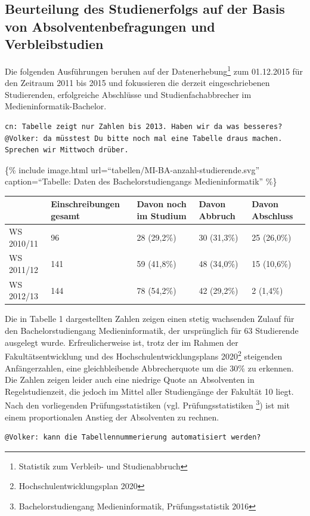 \subsection{Beurteilung des Studienerfolgs auf der Basis von
Absolventenbefragungen und
Verbleibstudien}\label{beurteilung-des-studienerfolgs-auf-der-basis-von-absolventenbefragungen-und-verbleibstudien}

Die folgenden Ausführungen beruhen auf der Datenerhebung\footnote{Statistik
  zum Verbleib- und Studienabbruch} zum 01.12.2015 für den Zeitraum 2011
bis 2015 und fokussieren die derzeit eingeschriebenen Studierenden,
erfolgreiche Abschlüsse und Studienfachabbrecher im
Medieninformatik-Bachelor.

\begin{verbatim}
cn: Tabelle zeigt nur Zahlen bis 2013. Haben wir da was besseres?
@Volker: da müsstest Du bitte noch mal eine Tabelle draus machen. Sprechen wir Mittwoch drüber.
\end{verbatim}

\{\% include image.html url=``tabellen/MI-BA-anzahl-studierende.svg''
caption=``Tabelle: Daten des Bachelorstudiengangs Medieninformatik''
\%\}

\begin{longtable}[]{@{}lllll@{}}
\toprule
~ & Einschreibungen gesamt & Davon noch im Studium & Davon Abbruch &
Davon Abschluss\tabularnewline
\midrule
\endhead
WS 2010/11 & 96 & 28 (29,2\%) & 30 (31,3\%) & 25 (26,0\%)\tabularnewline
WS 2011/12 & 141 & 59 (41,8\%) & 48 (34,0\%) & 15
(10,6\%)\tabularnewline
WS 2012/13 & 144 & 78 (54,2\%) & 42 (29,2\%) & 2 (1,4\%)\tabularnewline
\bottomrule
\end{longtable}

Die in Tabelle 1 dargestellten Zahlen zeigen einen stetig wachsenden
Zulauf für den Bachelorstudiengang Medieninformatik, der ursprünglich
für 63 Studierende ausgelegt wurde. Erfreulicherweise ist, trotz der im
Rahmen der Fakultätsentwicklung und des Hochschulentwicklungsplans
2020\footnote{Hochschulentwicklungsplan 2020} steigenden Anfängerzahlen,
eine gleichbleibende Abbrecherquote um die 30\% zu erkennen. Die Zahlen
zeigen leider auch eine niedrige Quote an Absolventen in
Regelstudienzeit, die jedoch im Mittel aller Studiengänge der Fakultät
10 liegt. Nach den vorliegenden Prüfungsstatistiken (vgl.
Prüfungsstatistiken \footnote{Bachelorstudiengang Medieninformatik,
  Prüfungsstatistik 2016}) ist mit einem proportionalen Anstieg der
Absolventen zu rechnen.

\begin{verbatim}
@Volker: kann die Tabellennummerierung automatisiert werden?
\end{verbatim}

